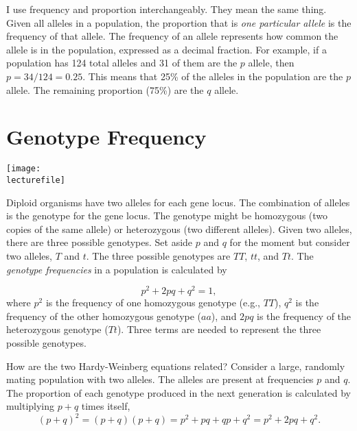 \documentclass[letterpaper]{tufte-handout}
\newcommand\lecturefile{163_lecture07_fullsize}
\begin{document}
I use frequency and proportion interchangeably. They mean the same thing.  Given all alleles in a population, the proportion that is \emph{one particular allele} is the frequency of that allele.  The frequency of an allele represents how common the allele is in the population, expressed as a decimal fraction. For example, if a population has 124 total alleles and 31 of them are the $p$ allele, then $p= 34/124 = 0.25$.  This means that 25\% of the alleles in the population are the $p$ allele.  The remaining proportion (75\%) are the $q$ allele.

\section{Genotype Frequency}

\begin{marginfigure}[0.35in]
	\texttt{[image: \\lecturefile]}
\end{marginfigure}

Diploid organisms have two alleles for each gene locus. The combination of alleles is the genotype for the gene locus. The genotype might be homozygous (two copies of the same allele) or heterozygous (two different alleles).  Given two alleles, there are three possible genotypes. Set aside $p$ and $q$ for the moment but consider two alleles, $T$ and $t$. The three possible genotypes are $TT$, $tt$, and $Tt$.  The \emph{genotype frequencies} in a population is calculated by

\begin{equation*}
p^2 + 2pq+q^2=1,
\end{equation*}
where $p^2$ is the frequency of one homozygous genotype (e.g., $TT$), $q^2$ is the frequency of the other homozygous genotype ($aa$), and $2pq$ is the frequency of the heterozygous genotype ($Tt$).  Three terms are needed to represent the three possible genotypes. 

How are the two Hardy-Weinberg equations related?  Consider a large, randomly mating population with two alleles.  The alleles are present at frequencies $p$ and $q$.  The proportion of each genotype produced in the next generation is calculated by multiplying $p+q$ times itself,
\begin{equation*}
(p+q)^2=
(p+q)(p+q) =
p^2 + pq + qp + q^2 =
p^2 + 2pq + q^2.
\end{equation*}
\end{document}
